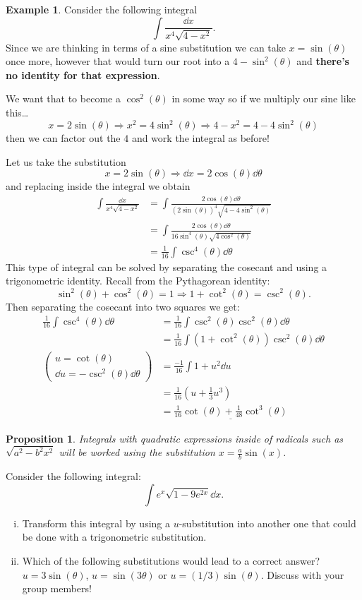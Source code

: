 \documentclass[12pt]{article}
\theoremstyle{plain}
\newtheorem{Prop}[Th]{Proposition}     %
\theoremstyle{definition}
\newtheorem{Ex}[Th]{Example}           %
\theoremstyle{remark}
\newcommand{\te}{\theta}                %
\renewcommand{\:}{\colon}           %
\newcommand{\un}[1]{\underline{#1}}
\renewcommand{\.}{\Cdot}                %
\newcommand{\To}{\Rightarrow}
\begin{document}
\begin{multicols}{2}
\begin{Ex}
  Consider the following integral
  $$\int\frac{\dd x}{x^4\sqrt{4-x^2}}.$$
  Since we are thinking in terms of a sine substitution we can take $x=\sin(\te)$ once more, however that would turn our root into a 
  $4-\sin^2(\te)$ and \textbf{there's no identity for that expression}.\par
  We want that to become a $\cos^2(\te)$ in some way so if we multiply our sine like this\dots
  $$x=2\sin(\te)\To x^2=4\sin^2(\te)\To 4-x^2=4-4\sin^2(\te)$$
  then we can factor out the $4$ and work the integral as before!\par 
  Let us take the substitution
  $$x=2\sin(\te)\To\dd x=2\cos(\te)\dd\te$$
  and replacing inside the integral we obtain 
  \begin{align*}
    \int\frac{\dd x}{x^4\sqrt{4-x^2}}&=\int\frac{2\cos(\te)\dd\te}{(2\sin(\te))^4\sqrt{4-4\sin^2(\te)}}\\
    &=\int\frac{2\cos(\te)\dd\te}{16\sin^4(\te)\sqrt{4\cos^2(\te)}}\\
    &=\frac{1}{16}\int\csc^4(\te)\dd\te
  \end{align*}
This type of integral can be solved by separating the cosecant and using a trigonometric identity. Recall from the Pythagorean identity:
$$\sin^2(\te)+\cos^2(\te)=1\To 1+\cot^2(\te)=\csc^2(\te).$$
Then separating the cosecant into two squares we get:
\begin{align*}
  \frac{1}{16}\int\csc^4(\te)\dd\te&=\frac{1}{16}\int\csc^2(\te)\csc^2(\te)\dd\te\\
  &=\frac{1}{16}\int(1+\cot^2(\te))\csc^2(\te)\dd\te\\
  (\substack{u=\cot(\te)\\ \dd u=-\csc^2(\te)\dd\te})&=\frac{-1}{16}\int 1+u^2\dd u\\
  &=\frac{1}{16}\left(u+\frac{1}{3}u^3\right)\\
  &=\un{\frac{1}{16}\cot(\te)+\frac{1}{48}\cot^3(\te)}
\end{align*}
\end{Ex}

\begin{Prop}
Integrals with quadratic expressions inside of radicals such as \un{$\sqrt{a^2-b^2x^2}$} will be worked using the substitution \un{$x=\frac{a}{b}\sin(x)$}.
\end{Prop}

\begin{ptcbP}
Consider the following integral:
$$\int e^x\sqrt{1-9e^{2x}}\dd x.$$
\begin{enumerate}[i)]
  \itemsep=-0.4em
  \item Transform this integral by using a $u$-substitution into another one that could be done with a trigonometric substitution.
  \item Which of the following substitutions would lead to a correct answer? $u=3\sin(\te)$, $u=\sin(3\te)$ or $u=(1/3)\sin(\te)$. Discuss with your group members!
\end{enumerate}
\end{ptcbP}


\end{multicols}
\end{document}
